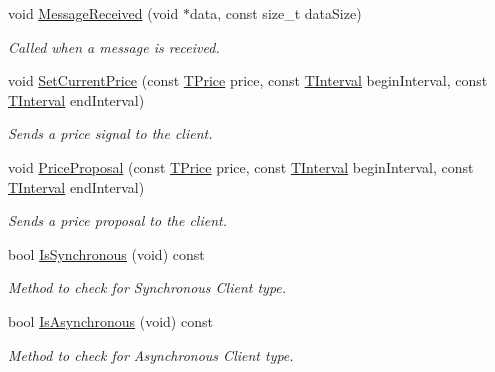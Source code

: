 \begin{DoxyCompactItemize}
void \hyperlink{class_client_manager_abf05d2ac88337dfd02e0b7986ee1e18c}{Message\-Received} (void $\ast$data, const size\-\_\-t data\-Size)
\begin{DoxyCompactList}\small\item\em Called when a message is received. \end{DoxyCompactList}\item 
void \hyperlink{class_client_manager_adb64a2ee5d0eb7b1a4bdedcd0e3b92f5}{Set\-Current\-Price} (const \hyperlink{class_client_manager_ae957a71b432eb6d9d39b0f397cd89874}{T\-Price} price, const \hyperlink{class_client_manager_a429cc3229a8121c83655945ebaec18a6}{T\-Interval} begin\-Interval, const \hyperlink{class_client_manager_a429cc3229a8121c83655945ebaec18a6}{T\-Interval} end\-Interval)
\begin{DoxyCompactList}\small\item\em Sends a price signal to the client. \end{DoxyCompactList}\item 
void \hyperlink{class_client_manager_ae297765312b5f2f93f7b8ec700ad2fbb}{Price\-Proposal} (const \hyperlink{class_client_manager_ae957a71b432eb6d9d39b0f397cd89874}{T\-Price} price, const \hyperlink{class_client_manager_a429cc3229a8121c83655945ebaec18a6}{T\-Interval} begin\-Interval, const \hyperlink{class_client_manager_a429cc3229a8121c83655945ebaec18a6}{T\-Interval} end\-Interval)
\begin{DoxyCompactList}\small\item\em Sends a price proposal to the client. \end{DoxyCompactList}\item 
bool \hyperlink{class_client_manager_a626b9383b2b2b7924a1f1e183800fe72}{Is\-Synchronous} (void) const 
\begin{DoxyCompactList}\small\item\em Method to check for Synchronous Client type. \end{DoxyCompactList}\item 
bool \hyperlink{class_client_manager_ab3f0c2bb301ba8d1218d703e5446baf3}{Is\-Asynchronous} (void) const 
\begin{DoxyCompactList}\small\item\em Method to check for Asynchronous Client type. \end{DoxyCompactList}\end{DoxyCompactItemize}
